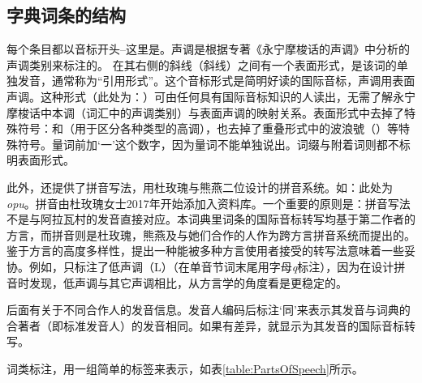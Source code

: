 \subsection{字典词条的结构}
\label{sec:structure_of_entries}

每个条目都以音标开头--这里是。声调是根据专著《永宁摩梭话的声调》中分析的声调类别来标注的\parencite[80-90]{michaud2017}。
在其右侧的斜线（斜线）之间有一个表面形式，是该词的单独发音，通常称为“引用形式”。这个音标形式是简明好读的国际音标，声调用表面声调。这种形式（此处为：）可由任何具有国际音标知识的人读出，无需了解永宁摩梭话中本调（词汇中的声调类别）与表面声调的映射关系。表面形式中去掉了特殊符号：\phonologie{\$}和\phonologie{\#}（用于区分各种类型的高调），也去掉了重叠形式中的波浪號（\phonologie{\hspace{0.5em}\raisebox{-0.6ex}{\~}}）等特殊符号。量词前加‘一’这个数字，因为量词不能单独说出。词缀与附着词则都不标明表面形式。

此外，还提供了拼音写法，用杜玫瑰与熊燕二位设计的拼音系统\parencite{dobbs_ortho_2018}。如：此处为\emph{opu}。拼音由杜玫瑰女士2017年开始添加入资料库。一个重要的原则是：拼音写法不是与阿拉瓦村的发音直接对应。本词典里词条的国际音标转写均基于第二作者的方言，而拼音则是杜玫瑰，熊燕及与她们合作的人作为跨方言拼音系统而提出的。鉴于方言的高度多样性，提出一种能被多种方言使用者接受的转写法意味着一些妥协。例如，只标注了低声调（L）（在单音节词末尾用字母\emph{q}标注），因为在设计拼音时发现，低声调与其它声调相比，从方言学的角度看是更稳定的。

后面有关于不同合作人的发音信息。发音人编码后标注‘同’来表示其发音与词典的合著者（即标准发音人）的发音相同。如果有差异，就显示为其发音的国际音标转写。

词类标注，用一组简单的标签来表示，如表\ref{table:PartsOfSpeech}所示。

